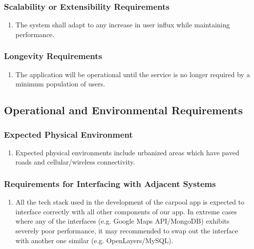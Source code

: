 \documentclass[]{article}
\begin{document}
\subsubsection{Scalability or Extensibility Requirements}
\label{ssub:scalability_or_extensibility_requirements}
\begin{enumerate}[{PR-SE}1. ]
	\item The system shall adapt to any increase in user influx while maintaining performance.
\end{enumerate}

\subsubsection{Longevity Requirements}
\label{ssub:longevity_requirements}
\begin{enumerate}[{PR-L}1. ]
	\item The application will be operational until the service is no longer required by a minimum population of users.
\end{enumerate}


\subsection{Operational and Environmental Requirements}
\label{sub:operational_and_environmental_requirements}

\subsubsection{Expected Physical Environment}
\label{ssub:expected_physical_environment}
\begin{enumerate}[{OE-EPE}1. ]
	\item Expected physical environments include urbanized areas which have paved roads and cellular/wireless connectivity.
\end{enumerate}

\subsubsection{Requirements for Interfacing with Adjacent Systems}
\label{ssub:requirements_for_interfacing_with_adjacent_systems}
\begin{enumerate}[{OE-IA}1. ]
	\item All the tech stack used in the development of the carpool app is expected to interface correctly with all other components of our app. In extreme cases where any of the interfaces (e.g. Google Maps API/MongoDB) exhibits severely poor performance, it may recommended to swap out the interface with another one similar (e.g. OpenLayers/MySQL).
\end{enumerate}
\end{document}
